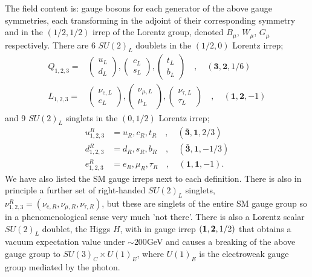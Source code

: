 The field content is: gauge bosons for each generator of the above gauge symmetries, each transforming in the adjoint of their corresponding symmetry and in the $(1/2,1/2)$ irrep of the Lorentz group, denoted $B_{\mu}$, $W_{\mu}$, $G_{\mu}$ respectively. There are 6 $SU(2)_L$ doublets in the $(1/2,0)$ Lorentz irrep;
\begin{align}
  Q_{1,2,3} =&
  \begin{pmatrix} u_L \\ d_L \end{pmatrix},
  \begin{pmatrix} c_L \\ s_L \end{pmatrix},
  \begin{pmatrix} t_L \\ b_L \end{pmatrix}
  \quad,\quad
  (\mathbf{3},\mathbf{2},1/6) \\
  L_{1,2,3} =&
  \begin{pmatrix} \nu_{e,L} \\ e_L \end{pmatrix},
  \begin{pmatrix} \nu_{\mu,L} \\ \mu_L \end{pmatrix},
  \begin{pmatrix} \nu_{\tau,L} \\ \tau_L \end{pmatrix}
  \quad,\quad
  (\mathbf{1},\mathbf{2},-1)
\end{align}
and 9 $SU(2)_L$ singlets in the $(0,1/2)$ Lorentz irrep;
\begin{align}
  u^R_{1,2,3} &= u_R, c_R, t_R\quad,\quad (\bar{\mathbf{3}},\mathbf{1},2/3) \\
  d^R_{1,2,3} &= d_R, s_R, b_R\quad,\quad (\bar{\mathbf{3}},\mathbf{1},-1/3) \\
  e^R_{1,2,3} &= e_R, \mu_R, \tau_R\quad,\quad (\mathbf{1},\mathbf{1},-1).
\end{align}
We have also listed the SM gauge irreps next to each definition. There is also in principle a further set of right-handed $SU(2)_L$ singlets, $\nu^R_{1,2,3} = (\nu_{e,R}, \nu_{\mu,R}, \nu_{\tau,R})$, but these are singlets of the entire SM gauge group so in a phenomenological sense very much 'not there'. There is also a Lorentz scalar $SU(2)_L$ doublet, the Higgs $H$, with in gauge irrep $({\bf{1}},{\bf{2}},1/2)$ that obtains a vacuum expectation value under $\sim 200$GeV and causes a breaking of the above gauge group to $SU(3)_C\times U(1)_E$, where $U(1)_E$ is the electroweak gauge group mediated by the photon.
